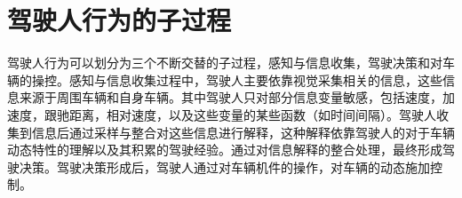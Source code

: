 %
%
% 
%
%
\section{驾驶人行为的子过程}
驾驶人行为可以划分为三个不断交替的子过程，感知与信息收集，驾驶决策和对车辆的操控。感知与信息收集过程中，驾驶人主要依靠视觉采集相关的信息，这些信息来源于周围车辆和自身车辆。其中驾驶人只对部分信息变量敏感，包括速度，加速度，跟驰距离，相对速度，以及这些变量的某些函数（如时间间隔）。驾驶人收集到信息后通过采样与整合对这些信息进行解释，这种解释依靠驾驶人的对于车辆动态特性的理解以及其积累的驾驶经验。通过对信息解释的整合处理，最终形成驾驶决策。驾驶决策形成后，驾驶人通过对车辆机件的操作，对车辆的动态施加控制。

